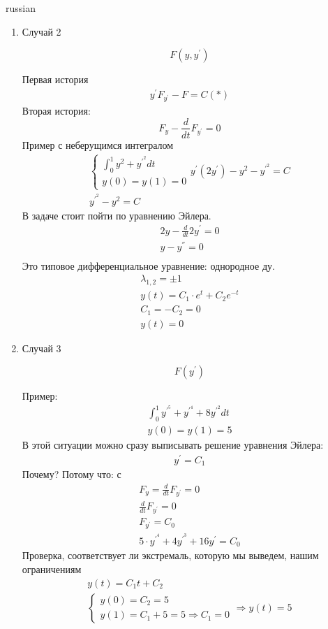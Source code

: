 \documentclass{article}
\begin{document}
\begin{otherlanguage*}{russian}
\begin{enumerate}
\item Случай 2 

\begin{equation}
F(y, y^{'}) 
\end{equation}

Первая история
\begin{align}
y^{'} F_{y^{'}} - F = C (*) 
\end{align}
Вторая история: 
\begin{equation}
F_y - \frac{d}{dt} F_{y^{'}} = 0
\end{equation}
Пример с неберущимся интегралом
\begin{align}
\begin{cases}
\int_0^1 y^2 + y^{'^{2}} dt  \\
y(0) = y(1) = 0 
\end{cases}
y^{'} (2y^{'}) - y ^ 2 - y^{'^{2}} = C \\
y^{'^{2}} - y ^ 2 = C 
\end{align}
В задаче стоит пойти по уравнению Эйлера.
\begin{align}
2y - \frac{d}{dt} 2 y^{'} = 0 \\
y - y^{''} = 0 \\
\end{align}
Это типовое дифференциальное уравнение: однородное ду. 
\begin{align}
\lambda_{1, 2} = \pm 1 \\
y(t) = C_1 \cdot e ^t + C_2 e ^{-t} \\
C_1 = -C_2 = 0 \\
y(t) = 0 
\end{align}

\item Случай 3

\begin{equation}
F(y^{'}) 
\end{equation}

Пример: 
\begin{align}
\int_0^1 y^{'^{5}} + y^{'^{4}} + 8y^{'^{2}} dt \\
y(0) = y(1) = 5 
\end{align}
В этой ситуации можно сразу выписывать решение уравнения Эйлера: 
\begin{align}
y^{'} = C_1 
\end{align}
Почему? Потому что: с
\begin{align}
F_y = \frac{d}{dt} F_{y^{'}} = 0 \\
\frac{d}{dt} F_{y^{'}} = 0 \\
F_{y^{'}} = C_0 \\
5 \cdot y^{'^{4}} + 4 y^{'^{3}} + 16 y ^{'} = C_0 
\end{align}
Проверка, соответствует ли экстремаль, которую мы выведем, нашим ограничениям
\begin{align}
y(t) = C_1 t + C_2 \\
\begin{cases}
y(0) = C_2 = 5 \\
y(1) = C_1 + 5 = 5 \Rightarrow C_1 = 0 
\end{cases} \Rightarrow y(t) = 5 
\end{align}


\end{enumerate}
\end{otherlanguage*}
\end{document}
